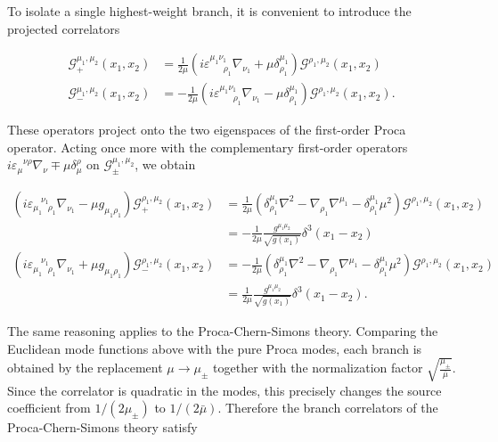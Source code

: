 To isolate a single highest-weight branch, it is convenient to introduce the projected correlators

\begin{align}
\mathcal{G}_{+}^{\mu_{1},\mu_{2}}(x_{1},x_{2}) & =\frac{1}{2\mu}(i\varepsilon ^{\mu_{1}\nu_{1}}_{~~~~~~~\rho_{1}}\nabla _{\nu_{1}}+\mu \delta ^{\mu_{1}}_{\rho_{1}})\mathcal{G}^{\rho_{1},\mu_{2}}(x_{1},x_{2}) \\
\mathcal{G}_{-}^{\mu_{1},\mu_{2}}(x_{1},x_{2}) & =-\frac{1}{2\mu}(i\varepsilon ^{\mu_{1}\nu_{1}}_{~~~~~~~\rho_{1}}\nabla _{\nu_{1}}-\mu \delta _{\rho_{1}}^{\mu_{1}})\mathcal{G}^{\rho_{1},\mu_{2}}(x_{1},x_{2}).
\end{align}

These operators project onto the two eigenspaces of the first-order Proca operator. Acting once more with the complementary first-order operators $i\varepsilon _{\mu}^{~~~\nu \rho}\nabla _{\nu}\mp \mu \delta _{\mu}^{\rho}$ on $\mathcal{G}_{\pm}^{\mu_{1},\mu_{2}}$, we obtain

\begin{align}
(i\varepsilon _{\mu_{1}~~~\rho_{1}}^{~~~~\nu_{1}}\nabla _{\nu_{1}}-\mu g_{\mu_{1}\rho_{1}})\mathcal{G}_{+}^{\rho_{1},\mu_{2}}(x_{1},x_{2}) & =\frac{1}{2\mu}\left(\delta _{\rho_{1}}^{\mu_{1}}\nabla ^{2}-\nabla _{\rho_{1}}\nabla ^{\mu_{1}}-\delta _{\rho_{1}}^{\mu_{1}}\mu ^{2}\right)\mathcal{G}^{\rho_{1},\mu_{2}}(x_{1},x_{2}) \\
 & =-\frac{1}{2\mu} \frac{g^{\mu_{1}\mu_{2}}}{\sqrt{ g(x_{1}) }}\delta ^{3}(x_{1}-x_{2}) \\
(i\varepsilon _{\mu_{1}~~~\rho_{1}}^{~~~~\nu_{1}}\nabla _{\nu_{1}}+\mu g_{\mu_{1}\rho_{1}})\mathcal{G}_{-}^{\rho_{1},\mu_{2}}(x_{1},x_{2}) & =-\frac{1}{2\mu}\left(\delta _{\rho_{1}}^{\mu_{1}}\nabla ^{2}-\nabla _{\rho_{1}}\nabla ^{\mu_{1}}-\delta _{\rho_{1}}^{\mu_{1}}\mu ^{2}\right)\mathcal{G}^{\rho_{1},\mu_{2}}(x_{1},x_{2}) \\
 & =\frac{1}{2\mu} \frac{g^{\mu_{1}\mu_{2}}}{\sqrt{ g(x_{1}) }}\delta ^{3}(x_{1}-x_{2}).
\end{align}

The same reasoning applies to the Proca-Chern-Simons theory. Comparing the Euclidean mode functions above with the pure Proca modes, each branch is obtained by the replacement $\mu \rightarrow \mu_{\pm}$ together with the normalization factor $\sqrt{ \frac{\mu_{\pm}}{\bar{\mu}} }$. Since the correlator is quadratic in the modes, this precisely changes the source coefficient from $1/(2\mu_{\pm})$ to $1/(2\bar{\mu})$. Therefore the branch correlators of the Proca-Chern-Simons theory satisfy

